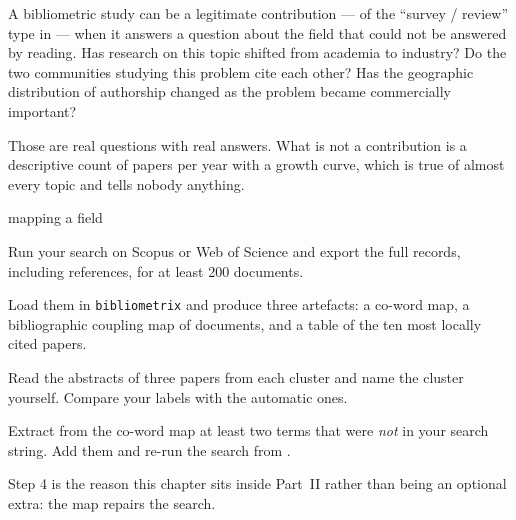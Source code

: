 \begin{conceptbox}
A bibliometric study can be a legitimate contribution --- of the ``survey /
review'' type in  --- when it answers a question about the
field that could not be answered by reading. Has research on this topic shifted
from academia to industry? Do the two communities studying this problem cite
each other? Has the geographic distribution of authorship changed as the
problem became commercially important?

\medskip
Those are real questions with real answers. What is not a contribution is a
descriptive count of papers per year with a growth curve, which is true of
almost every topic and tells nobody anything.
\end{conceptbox}

\begin{traditions}{mapping a field}
\end{traditions}

\begin{lab}
\begin{tightnum}
  \item Run your  search on Scopus or Web of Science and export the
    full records, including references, for at least 200 documents.
  \item Load them in \texttt{bibliometrix} and produce three artefacts: a
    co-word map, a bibliographic coupling map of documents, and a table of the
    ten most locally cited papers.
  \item Read the abstracts of three papers from each cluster and name the
    cluster yourself. Compare your labels with the automatic ones.
  \item Extract from the co-word map at least two terms that were \emph{not} in
    your search string. Add them and re-run the search from .
\end{tightnum}

\medskip
Step 4 is the reason this chapter sits inside Part~II rather than being an
optional extra: the map repairs the search.
\end{lab}

